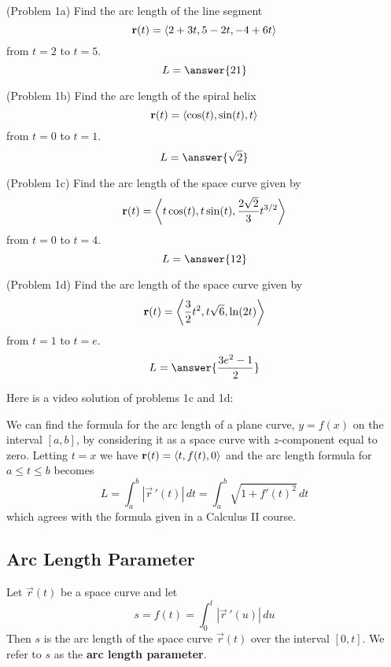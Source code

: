 \documentclass[handout]{ximera}
\begin{document}
\begin{problem}(Problem 1a)
Find the arc length of the line segment 
\[
\mathbf r(t) = \left\langle 2 + 3t, 5- 2t, -4 + 6t\right\rangle
\]
from $ t= 2$ to $t = 5$.
\[
L = \answer{21}
\]
\end{problem}


\begin{problem}(Problem 1b)
Find the arc length of the spiral helix 
\[
\mathbf r(t) = \left\langle \cos(t), \sin(t), t\right\rangle
\]
from $ t= 0$ to $t = 1$.
\[
L = \answer{\sqrt 2}
\]
\end{problem}


\begin{problem}(Problem 1c)
Find the arc length of the space curve given by
\[
\mathbf r(t) = \left\langle t\cos(t), t\sin(t), \frac{2\sqrt 2}{3} t^{3/2}\right\rangle
\]
from $ t= 0$ to $t = 4$.
\[
L = \answer{12}
\]
\end{problem}


\begin{problem}(Problem 1d)
Find the arc length of the space curve given by
\[
\mathbf r(t) = \left\langle \frac32 t^2, t\sqrt 6, \ln(2t)\right\rangle
\]
from $ t= 1$ to $t = e$.
\[
L = \answer{\frac{3e^2 -1}{2}}
\]
\end{problem}

Here is a video solution of problems 1c and 1d:\\
\begin{foldable}
\end{foldable}


We can find the formula for the arc length of a plane curve, $y = f(x)$ on the interval $[a,b]$, by considering it as a space curve with $z$-component equal to zero.
Letting $t = x$ we have $\mathbf r(t) = \left\langle t, f(t), 0\right\rangle$ and the arc length formula for $a \leq t \leq b$ becomes
\[
L = \int_a^b |\vec r\,'(t)| \, dt = \int_a^b \sqrt{1+ f'(t)^2} \, dt
\]
which agrees with the formula given in a Calculus II course.


\subsection{Arc Length Parameter}

Let $\vec r(t) $ be a space curve and let 
\[
s = f(t) = \int_0^t |\vec r\,'(u)| \, du
\]
Then $s$ is the arc length of the space curve $\vec r(t)$ over the interval $[0, t]$.
We refer to $s$ as the \textbf{arc length parameter}.
\end{document}
